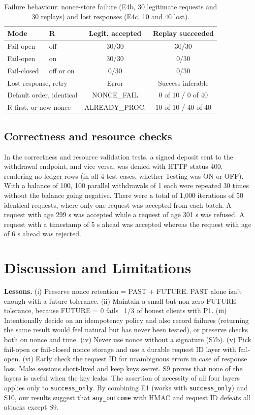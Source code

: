 \documentclass[conference]{IEEEtran}
\newcommand{\so}{\texttt{success\_only}}
\newcommand{\ao}{\texttt{any\_outcome}}
\begin{document}
\begin{table}[!t]
\caption{Failure behaviour: nonce-store failure (E4b, 30 legitimate requests and 30 replays) and lost responses (E4c, 10 and 40 lost).}
\label{tab:fail}
\centering
\footnotesize
\setlength{\tabcolsep}{3pt}
\begin{tabular}{@{}llcc@{}}
\toprule
Mode & R & Legit. accepted & Replay succeeded \\
\midrule
Fail-open & off & 30/30 & 30/30 \\
Fail-open & on & 30/30 & 0/30 \\
Fail-closed & off or on & 0/30 & 0/30 \\
\midrule
\multicolumn{2}{l}{Lost response, retry} & Error & Success inferable \\
\midrule
\multicolumn{2}{l}{Default order, identical} & NONCE\_FAIL & 0 of 10 / 0 of 40 \\
\multicolumn{2}{l}{R first, or new nonce} & ALREADY\_PROC. & 10 of 10 / 40 of 40 \\
\bottomrule
\end{tabular}
\end{table}

\subsection{Correctness and resource checks}
In the correctness and resource validation tests, a signed deposit sent to the withdrawal endpoint, and vice versa, was denied with HTTP status 400, rendering no ledger rows (in all 4 test cases, whether Testing was ON or OFF). With a balance of 100, 100 parallel withdrawals of 1 each were repeated 30 times without the balance going negative. There were a total of 1,000 iterations of 50 identical requests, where only one request was accepted from each batch. A request with age 299 s was accepted while a request of age 301 s was refused. A request with a timestamp of 5 s ahead was accepted whereas the request with age of 6 s ahead was rejected.

\section{Discussion and Limitations}\label{sec:disc}

\textbf{Lessons.} (i) Preserve nonce retention = PAST + FUTURE. PAST alone isn’t enough with a future tolerance. (ii) Maintain a small but non zero FUTURE tolerance, because FUTURE = 0 fails ~1/3 of honest clients with P1. (iii) Intentionally decide on an idempotency policy and also record failures (returning the same result would feel natural but has never been tested), or preserve checks both on nonce and time. (iv) Never use nonce without a signature (S7b). (v) Pick fail-open or fail-closed nonce storage and use a durable request ID layer with fail-open. (vi) Early check the request ID for unambiguous errors in case of response loss. Make sessions short-lived and keep keys secret. S9 proves that none of the layers is useful when the key leaks. The assertion of necessity of all four layers applies only to \so{}. By combining E1 (works with \so{}) and S10, our results suggest that \ao{} with HMAC and request ID defeats all attacks except S9.
\end{document}

